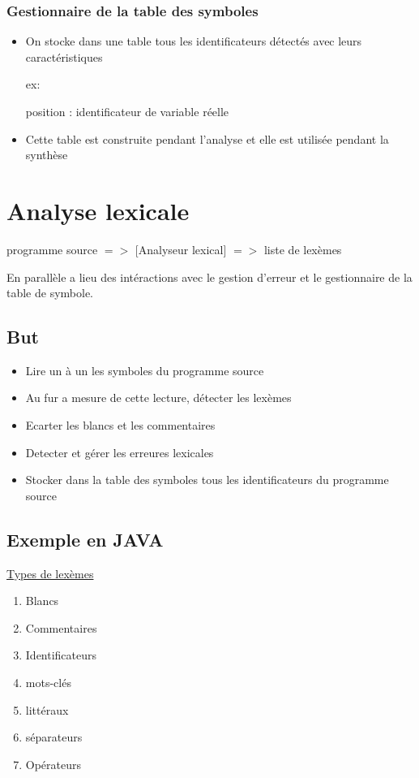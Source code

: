 \documentclass[a4paper,10pt]{report}
\begin{document}
 \subsection{Gestionnaire de la table des symboles}
    \begin{itemize}
     \item On stocke dans une table tous les identificateurs détectés avec leurs caractéristiques
     
     ex: 
     
     position : identificateur de variable réelle
     
     \item Cette table est construite pendant l'analyse et elle est utilisée pendant la synthèse
         
    \end{itemize}
    
    \chapter{Analyse lexicale}
    
    programme source $=>$ [Analyseur lexical] $=>$ liste de lexèmes
    
    En parallèle a lieu des intéractions avec le gestion d'erreur et le gestionnaire de la table de symbole.
    
    \section{But}
    \begin{itemize}
     \item Lire un à un les symboles du programme source
     \item Au fur a mesure de cette lecture, détecter les lexèmes
     \item Ecarter les blancs et les commentaires
     \item Detecter et gérer les erreures lexicales
     \item Stocker dans la table des symboles tous les identificateurs du programme source
    \end{itemize}
    
    \section{Exemple en JAVA}
    
      \underline{Types de lexèmes}
      \begin{enumerate}
       \item Blancs
       \item Commentaires
       \item Identificateurs
       \item mots-clés
       \item littéraux
       \item séparateurs
       \item Opérateurs
      \end{enumerate}
      
\end{document}
